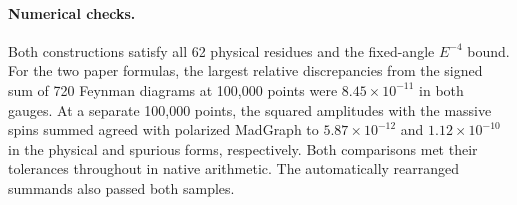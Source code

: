 \paragraph{Numerical checks.}
Both constructions satisfy all 62 physical residues and the fixed-angle
$E^{-4}$ bound. For the two paper formulas, the largest relative
discrepancies from the signed sum of 720 Feynman diagrams at 100,000
points were $8.45\times10^{-11}$ in both gauges. At a separate 100,000
points, the squared amplitudes with the massive spins summed agreed
with polarized MadGraph to $5.87\times10^{-12}$ and $1.12\times10^{-10}$
in the physical and spurious forms, respectively. Both comparisons met
their tolerances throughout in native arithmetic. The automatically
rearranged summands also passed both samples.
